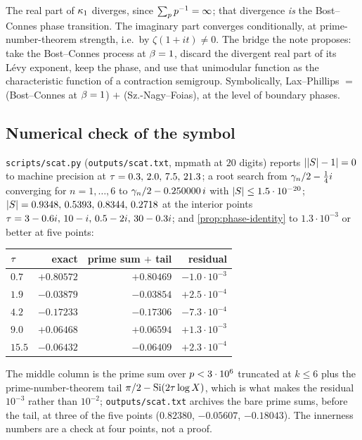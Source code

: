 The real part of $\kappa_{1}$ diverges, since $\sum_{p}p^{-1} = \infty$; that divergence
\emph{is} the Bost--Connes phase transition. The imaginary part converges conditionally,
at prime-number-theorem strength, i.e.\ by $\zeta(1+it)\ne0$. The bridge the note
proposes: take the Bost--Connes process at $\beta=1$, discard the divergent real part
of its L\'evy exponent, keep the phase, and use that unimodular function as the
characteristic function of a contraction semigroup. Symbolically, Lax--Phillips $=$
(Bost--Connes at $\beta=1$) $+$ (Sz.-Nagy--Foias), at the level of boundary phases.

\subsection{Numerical check of the symbol}

\begin{numerical}
\label{num:scattering-symbol}
\texttt{scripts/scat.py} (\texttt{outputs/scat.txt}, mpmath at $20$ digits) reports
$||S|-1| = 0$ to machine precision at $\tau = 0.3,\,2.0,\,7.5,\,21.3$; a root search
from $\gamma_{n}/2-\tfrac14 i$ converging for $n=1,\dots,6$ to $\gamma_{n}/2 - 0.250000\,i$ with
$|S| \le 1.5\cdot10^{-20}$; $|S| = 0.9348,\,0.5393,\,0.8344,\,0.2718$ at the
interior points $\tau = 3-0.6i,\,10-i,\,0.5-2i,\,30-0.3i$; and \cref{prop:phase-identity}
to $1.3\cdot10^{-3}$ or better at five points:
\begin{center}
\begin{tabular}{lrrr}
\toprule
$\tau$ & exact & prime sum $+$ tail & residual \\
\midrule
$0.7$  & $+0.80572$ & $+0.80469$ & $-1.0\cdot10^{-3}$ \\
$1.9$  & $-0.03879$ & $-0.03854$ & $+2.5\cdot10^{-4}$ \\
$4.2$  & $-0.17233$ & $-0.17306$ & $-7.3\cdot10^{-4}$ \\
$9.0$  & $+0.06468$ & $+0.06594$ & $+1.3\cdot10^{-3}$ \\
$15.5$ & $-0.06432$ & $-0.06409$ & $+2.3\cdot10^{-4}$ \\
\bottomrule
\end{tabular}
\end{center}
\end{numerical}

The middle column is the prime sum over $p<3\cdot10^6$ truncated at $k\le6$ plus the
prime-number-theorem tail $\pi/2 - \mathrm{Si}(2\tau\log X)$, which is what makes the
residual $10^{-3}$ rather than $10^{-2}$; \texttt{outputs/scat.txt} archives the bare
prime sums, before the tail, at three of the five points ($0.82380$, $-0.05607$,
$-0.18043$). The innerness numbers are a check at four points, not a proof.

